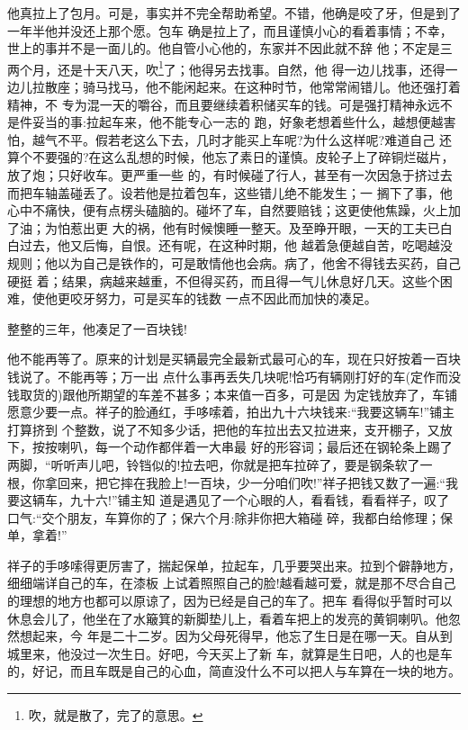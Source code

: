 \documentclass[11pt,a4paper,onecolumn]{article}
\begin{document}
他真拉上了包月。可是，事实并不完全帮助希望。不错，他确是咬了牙，但是到了一年半他并没还上那个愿。包车
确是拉上了，而且谨慎小心的看着事情；不幸，世上的事并不是一面儿的。他自管小心他的，东家并不因此就不辞
他；不定是三两个月，还是十天八天，吹\footnote{吹，就是散了，完了的意思。}了；他得另去找事。自然，他
得一边儿找事，还得一边儿拉散座；骑马找马，他不能闲起来。在这种时节，他常常闹错儿。他还强打着精神，不
专为混一天的嚼谷，而且要继续着积储买车的钱。可是强打精神永远不是件妥当的事:拉起车来，他不能专心一志的
跑，好象老想着些什么，越想便越害怕，越气不平。假若老这么下去，几时才能买上车呢?为什么这样呢?难道自己
还算个不要强的?在这么乱想的时候，他忘了素日的谨慎。皮轮子上了碎铜烂磁片，放了炮；只好收车。更严重一些
的，有时候碰了行人，甚至有一次因急于挤过去而把车轴盖碰丢了。设若他是拉着包车，这些错儿绝不能发生；一
搁下了事，他心中不痛快，便有点楞头磕脑的。碰坏了车，自然要赔钱；这更使他焦躁，火上加了油；为怕惹出更
大的祸，他有时候懊睡一整天。及至睁开眼，一天的工夫已白白过去，他又后悔，自恨。还有呢，在这种时期，他
越着急便越自苦，吃喝越没规则；他以为自己是铁作的，可是敢情他也会病。病了，他舍不得钱去买药，自己硬挺
着；结果，病越来越重，不但得买药，而且得一气儿休息好几天。这些个困难，使他更咬牙努力，可是买车的钱数
一点不因此而加快的凑足。

整整的三年，他凑足了一百块钱!

他不能再等了。原来的计划是买辆最完全最新式最可心的车，现在只好按着一百块钱说了。不能再等；万一出
点什么事再丢失几块呢!恰巧有辆刚打好的车(定作而没钱取货的)跟他所期望的车差不甚多；本来值一百多，可是因
为定钱放弃了，车铺愿意少要一点。祥子的脸通红，手哆嗦着，拍出九十六块钱来:``我要这辆车!''铺主打算挤到
个整数，说了不知多少话，把他的车拉出去又拉进来，支开棚子，又放下，按按喇叭，每一个动作都伴着一大串最
好的形容词；最后还在钢轮条上踢了两脚，``听听声儿吧，铃铛似的!拉去吧，你就是把车拉碎了，要是钢条软了一
根，你拿回来，把它摔在我脸上!一百块，少一分咱们吹!''祥子把钱又数了一遍:``我要这辆车，九十六!''铺主知
道是遇见了一个心眼的人，看看钱，看看祥子，叹了口气:``交个朋友，车算你的了；保六个月:除非你把大箱碰
碎，我都白给修理；保单，拿着!''

祥子的手哆嗦得更厉害了，揣起保单，拉起车，几乎要哭出来。拉到个僻静地方，细细端详自己的车，在漆板
上试着照照自己的脸!越看越可爱，就是那不尽合自己的理想的地方也都可以原谅了，因为已经是自己的车了。把车
看得似乎暂时可以休息会儿了，他坐在了水簸箕的新脚垫儿上，看着车把上的发亮的黄铜喇叭。他忽然想起来，今
年是二十二岁。因为父母死得早，他忘了生日是在哪一天。自从到城里来，他没过一次生日。好吧，今天买上了新
车，就算是生日吧，人的也是车的，好记，而且车既是自己的心血，简直没什么不可以把人与车算在一块的地方。
\end{document}
